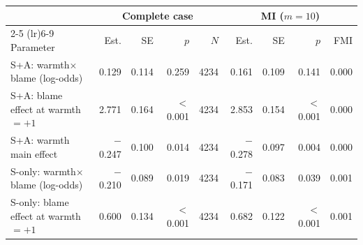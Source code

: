 \begin{tabular}{lrrrrrrrr}
\toprule
& \multicolumn{4}{c}{Complete case} & \multicolumn{4}{c}{MI ($m=10$)} \\
\cmidrule(lr){2-5} \cmidrule(lr){6-9}
Parameter & Est. & SE & $p$ & $N$ & Est. & SE & $p$ & FMI \\
\midrule
S+A: warmth$\times$blame (log-odds) & 0.129 & 0.114 & 0.259 & 4234 & 0.161 & 0.109 & 0.141 & 0.000 \\
S+A: blame effect at warmth$=+1$ & 2.771 & 0.164 & $<$0.001 & 4234 & 2.853 & 0.154 & $<$0.001 & 0.000 \\
S+A: warmth main effect & $-$0.247 & 0.100 & 0.014 & 4234 & $-$0.278 & 0.097 & 0.004 & 0.000 \\
S-only: warmth$\times$blame (log-odds) & $-$0.210 & 0.089 & 0.019 & 4234 & $-$0.171 & 0.083 & 0.039 & 0.001 \\
S-only: blame effect at warmth$=+1$ & 0.600 & 0.134 & $<$0.001 & 4234 & 0.682 & 0.122 & $<$0.001 & 0.001 \\
\bottomrule
\end{tabular}
